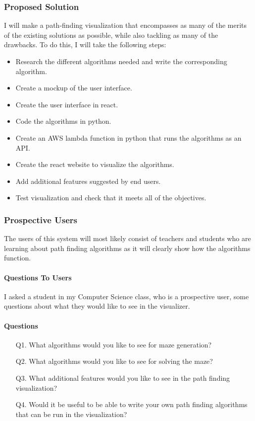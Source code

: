 \documentclass[titlepage]{article}
\begin{document}
\subsubsection{Proposed Solution}
I will make a path-finding visualization that encompasses as many of the merits of the existing solutions as possible, while also tackling as many of the drawbacks. To do this, I will take the following steps:
\begin{itemize}
    \item Research the different algorithms needed and write the corresponding algorithm.
    \item Create a mockup of the user interface.
    \item Create the user interface in react.
    \item Code the algorithms in python.
    \item Create an AWS lambda function in python that runs the algorithms as an API.
    \item Create the react website to visualize the algorithms.
    \item Add additional features suggested by end users.
    \item Test visualization and check that it meets all of the objectives.
\end{itemize}
\subsubsection{Prospective Users}
The users of this system will most likely consist of teachers and students who are learning about path finding algorithms as it will clearly show how the algorithms function.
\paragraph{Questions To Users}
I asked a student in my Computer Science class, who is a prospective user, some questions about what they would like to see in the visualizer.
\paragraph*{Questions}
\begin{enumerate}
    \item[Q1.]What algorithms would you like to see for maze generation?
    \item[Q2.]What algorithms would you like to see for solving the maze?
    \item[Q3.]What additional features would you like to see in the path finding visualization?
    \item[Q4.]Would it be useful to be able to write your own path finding algorithms that can be run in the visualization?  
\end{enumerate}
\end{document}
